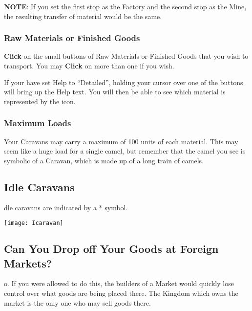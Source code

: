 \textbf{NOTE}: If you set the first stop as the Factory and the second stop as the Mine, the resulting transfer of material would be the same.

\subsubsection{\textsf{Raw Materials or Finished Goods}}

\textbf{Click} on the small buttons of Raw Materials or Finished Goods that you wish to transport. You may \textbf{Click} on more than one if you wish.

If your have set Help to “Detailed”, holding your cursor over one of the buttons will bring up the Help text. You will then be able to see which material is represented by the icon.

\subsubsection{\textsf{Maximum Loads}}

Your Caravans may carry a maximum of 100 units of each material. This may seem like a huge load for a single camel, but remember that the camel you see is symbolic of a Caravan, which is made up of a long train of camels.

\subsection{\textsf{Idle Caravans}}



dle caravans are indicated by a * symbol.

\begin{center}
	\texttt{[image: Icaravan]}
\end{center}

\subsection{\textsf{Can You Drop off Your Goods at Foreign Markets?}}


o. If you were allowed to do this, the builders of a Market would quickly lose control over what goods are being placed there. The Kingdom which owns the market is the only one who may sell goods there.

